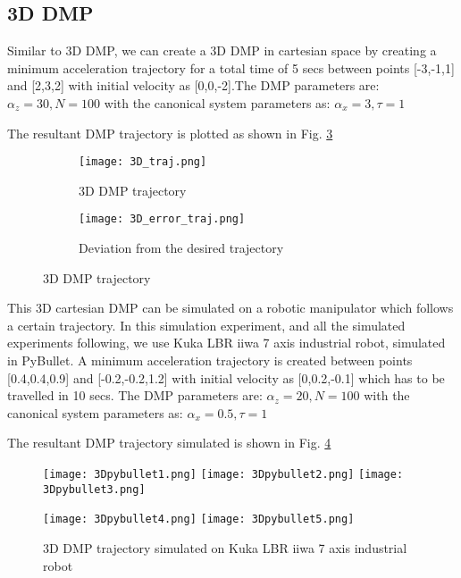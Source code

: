 \subsection{3D DMP}
Similar to 3D DMP, we can create a 3D DMP in cartesian space by creating a minimum acceleration trajectory for a total time of 5 secs 
between points [-3,-1,1] and [2,3,2] with initial velocity as [0,0,-2].The DMP parameters are: $\alpha_z = 30, N = 100$ with the canonical system parameters as: 
$\alpha_x = 3, \tau = 1$

The resultant DMP trajectory is plotted as shown in Fig. \ref{fig:3D_traj}

\begin{figure}[h]
    \centering
    \begin{subfigure}{0.5\textwidth}
        \texttt{[image: 3D\_traj.png]}
        \caption{3D DMP trajectory}
        \label{fig:3D_traj}
    \end{subfigure}%
    \begin{subfigure}{0.5\textwidth}
        \centering
        \texttt{[image: 3D\_error\_traj.png]}
        \caption{Deviation from the desired trajectory}
        \label{fig:3D_traj_error}
    \end{subfigure}
    \caption{3D DMP trajectory}
    \label{fig:3D_traj}
\end{figure}

This 3D cartesian DMP can be simulated on a robotic manipulator which follows a certain trajectory.
In this simulation experiment, and all the simulated experiments following, we use Kuka LBR iiwa 
7 axis industrial robot, simulated in PyBullet.
A minimum acceleration trajectory is created between points [0.4,0.4,0.9] and [-0.2,-0.2,1.2] 
 with initial velocity as [0,0.2,-0.1] which has to be travelled in 10 secs. The DMP parameters are:
  $\alpha_z = 20, N = 100$ with the canonical system parameters as: 
  $\alpha_x = 0.5, \tau = 1$

The resultant DMP trajectory simulated is shown in Fig. \ref{fig:3D_only_taj_pybullet}

\begin{figure}[h]
    \centering
    \texttt{[image: 3Dpybullet1.png]}\quad
    \texttt{[image: 3Dpybullet2.png]}\quad
    \texttt{[image: 3Dpybullet3.png]}

    \medskip

    \texttt{[image: 3Dpybullet4.png]}\quad
    \texttt{[image: 3Dpybullet5.png]}

    \caption{3D DMP trajectory simulated on Kuka LBR iiwa 7 axis industrial robot}
    \label{fig:3D_only_taj_pybullet}
\end{figure}


